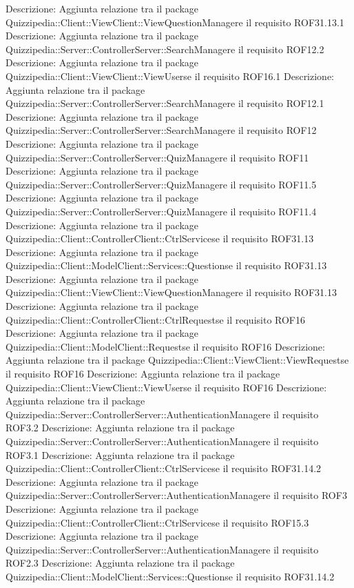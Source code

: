 Descrizione: Aggiunta relazione tra il package Quizzipedia::Client::ViewClient::ViewQuestionManagere il requisito ROF31.13.1 
Descrizione: Aggiunta relazione tra il package Quizzipedia::Server::ControllerServer::SearchManagere il requisito ROF12.2 
Descrizione: Aggiunta relazione tra il package Quizzipedia::Client::ViewClient::ViewUserse il requisito ROF16.1 
Descrizione: Aggiunta relazione tra il package Quizzipedia::Server::ControllerServer::SearchManagere il requisito ROF12.1 
Descrizione: Aggiunta relazione tra il package Quizzipedia::Server::ControllerServer::SearchManagere il requisito ROF12 
Descrizione: Aggiunta relazione tra il package Quizzipedia::Server::ControllerServer::QuizManagere il requisito ROF11 
Descrizione: Aggiunta relazione tra il package Quizzipedia::Server::ControllerServer::QuizManagere il requisito ROF11.5 
Descrizione: Aggiunta relazione tra il package Quizzipedia::Server::ControllerServer::QuizManagere il requisito ROF11.4 
Descrizione: Aggiunta relazione tra il package Quizzipedia::Client::ControllerClient::CtrlServicese il requisito ROF31.13 
Descrizione: Aggiunta relazione tra il package Quizzipedia::Client::ModelClient::Services::Questionse il requisito ROF31.13 
Descrizione: Aggiunta relazione tra il package Quizzipedia::Client::ViewClient::ViewQuestionManagere il requisito ROF31.13 
Descrizione: Aggiunta relazione tra il package Quizzipedia::Client::ControllerClient::CtrlRequestse il requisito ROF16 
Descrizione: Aggiunta relazione tra il package Quizzipedia::Client::ModelClient::Requestse il requisito ROF16 
Descrizione: Aggiunta relazione tra il package Quizzipedia::Client::ViewClient::ViewRequestse il requisito ROF16 
Descrizione: Aggiunta relazione tra il package Quizzipedia::Client::ViewClient::ViewUserse il requisito ROF16 
Descrizione: Aggiunta relazione tra il package Quizzipedia::Server::ControllerServer::AuthenticationManagere il requisito ROF3.2 
Descrizione: Aggiunta relazione tra il package Quizzipedia::Server::ControllerServer::AuthenticationManagere il requisito ROF3.1 
Descrizione: Aggiunta relazione tra il package Quizzipedia::Client::ControllerClient::CtrlServicese il requisito ROF31.14.2 
Descrizione: Aggiunta relazione tra il package Quizzipedia::Server::ControllerServer::AuthenticationManagere il requisito ROF3 
Descrizione: Aggiunta relazione tra il package Quizzipedia::Client::ControllerClient::CtrlServicese il requisito ROF15.3 
Descrizione: Aggiunta relazione tra il package Quizzipedia::Server::ControllerServer::AuthenticationManagere il requisito ROF2.3 
Descrizione: Aggiunta relazione tra il package Quizzipedia::Client::ModelClient::Services::Questionse il requisito ROF31.14.2 
